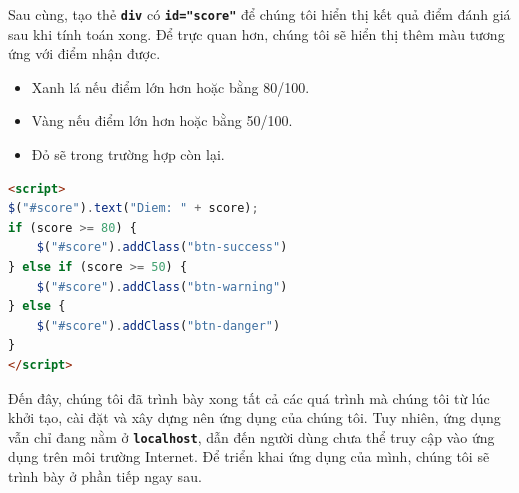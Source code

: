 \par
Sau cùng, tạo thẻ \textbf{\texttt{div}} có \textbf{\texttt{id="score"}} để chúng tôi hiển thị kết quả điểm đánh giá sau khi tính toán xong. Để trực quan hơn, chúng tôi sẽ hiển thị thêm màu tương ứng với điểm nhận được.
\begin{itemize}
    \item Xanh lá nếu điểm lớn hơn hoặc bằng 80/100.
    \item Vàng nếu điểm lớn hơn hoặc bằng 50/100.
    \item Đỏ sẽ trong trường hợp còn lại.
\end{itemize}
\begin{lstlisting}[language=html]
<script>
$("#score").text("Diem: " + score);
if (score >= 80) {
    $("#score").addClass("btn-success")
} else if (score >= 50) {
    $("#score").addClass("btn-warning")
} else {
    $("#score").addClass("btn-danger")
}
</script>
\end{lstlisting}
\par
Đến đây, chúng tôi đã trình bày xong tất cả các quá trình mà chúng tôi từ lúc khởi tạo, cài đặt và xây dựng nên ứng dụng của chúng tôi. Tuy nhiên, ứng dụng vẫn chỉ đang nằm ở \textbf{\texttt{localhost}}, dẫn đến người dùng chưa thể truy cập vào ứng dụng trên môi trường Internet. Để triển khai ứng dụng của mình, chúng tôi sẽ trình bày ở phần tiếp ngay sau.
